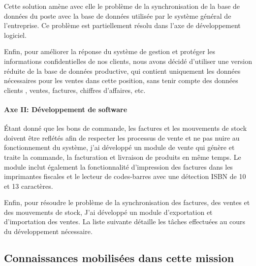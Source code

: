 \documentclass{resume} %
\begin{document}
Cette solution amène avec elle le problème de la synchronisation de la base de données du poste avec la base de données utilisée par le système général de l'entreprise. Ce problème est partiellement résolu dans l'axe de développement logiciel.

Enfin, pour améliorer la réponse du système de gestion et protéger les informations confidentielles de nos clients, nous avons décidé d'utiliser une version réduite de la base de données productive, qui contient uniquement les données nécessaires pour les ventes dans cette position, sans tenir compte des données clients , ventes, factures, chiffres d'affaires, etc.
	
		\paragraph{Axe II: Développement de software}	
Étant donné que les bons de commande, les factures et les mouvements de stock doivent être reflétés afin de respecter les processus de vente et ne pas nuire au fonctionnement du système, j'ai développé un module de vente qui génère et traite la commande, la facturation et livraison de produits en même temps.
Le module inclut également la fonctionnalité d'impression des factures dans les imprimantes fiscales et le lecteur de codes-barres avec une détection ISBN de 10 et 13 caractères.

Enfin, pour résoudre le problème de la synchronisation des factures, des ventes et des mouvements de stock, J'ai développé un module d'exportation et d'importation des ventes.
La liste suivante détaille les tâches effectuées au cours du développement nécessaire.

	\subsection {Connaissances mobilisées dans cette mission }
			
\end{document}
